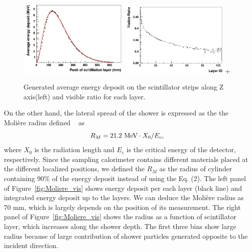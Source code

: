 \documentclass[jkps,preprint,fleqn,showpacs,showkeys]{revtex4}
\begin{document}
\begin{figure}[!hbt]
\includegraphics[width=0.48\textwidth]{figures/LongProfile.jpg}
\includegraphics[width=0.48\textwidth]{figures/LayerVisibleRatio.jpg}+
\caption{Generated average energy deposit on the scintillator strips along Z axis(left) and visible ratio for each layer.}
\label{fig:Longitudinal}
\end{figure}

On the other hand, the lateral spread of the shower
is expressed as the the Molière radius defined ~\cite{PDG} as 
\begin{equation}
R_M= 21.2~{\rm MeV}\cdot X_0 /E_c,
\end{equation}
where $X_0$ is the radiation length and $E_c$ is the critical energy of the detector, respectively. 
Since the sampling calorimeter contains different materials placed at the different localized positions, we defined the $R_M$ as the radius of cylinder containing 90\% of the energy deposit instead of using the Eq. (2). The left panel of Figure~\ref{fig:Moliere_vis} shows energy deposit per each layer (black line) and integrated energy deposit up to the layers. We can deduce the Molière radius as 70 mm, which is largely depends on the position of its measurement. The right panel of Figure~\ref{fig:Moliere_vis} shows the radius as a function of scintillator layer, which increases along the shower depth. The first three bins show large radius because of large contribution of shower particles generated opposite to the incident direction.    
\end{document}
